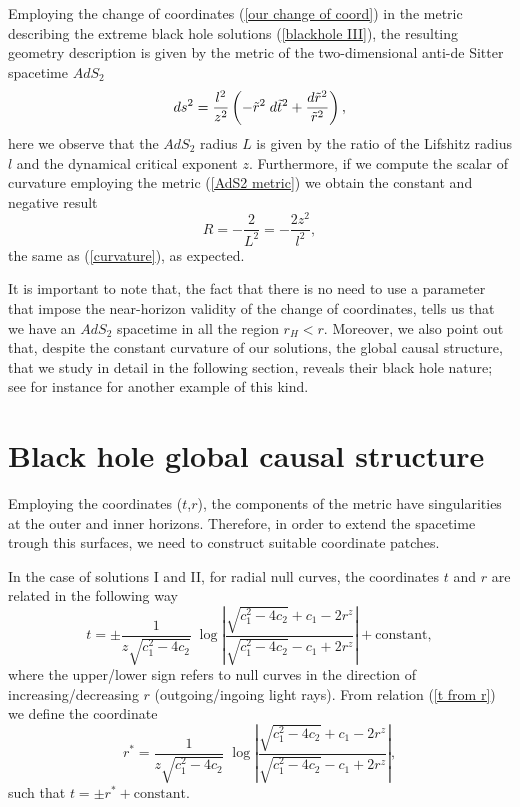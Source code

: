 \documentclass[sn-mathphys,Numbered]{sn-jnl}%
\theoremstyle{thmstyleone}%
\theoremstyle{thmstyletwo}%
\theoremstyle{thmstylethree}%
\begin{document}
Employing the change of coordinates (\ref{our change of coord}) in the metric describing the extreme black hole solutions (\ref{blackhole III}), the resulting geometry description is given by the metric of the two-dimensional anti-de Sitter spacetime $AdS_2$
%
\begin{equation} \label{AdS2 metric}
    ds^2=\frac{l^2}{z^2} \left(-\Tilde{r}^2\;d\Tilde{t}^2+\frac{d\Tilde{r}^2}{\Tilde{r}^2}\right),
\end{equation}
here we observe that the $AdS_2$ radius $L$ is given by the ratio of the Lifshitz radius $l$ and the dynamical critical exponent $z$. Furthermore, if we compute the scalar of curvature employing the metric (\ref{AdS2 metric}) we obtain the constant and negative result
%
\begin{equation}
    R= -\frac{2}{L^2}= - \frac{2 z^2}{l^2},
\end{equation}
the same as (\ref{curvature}), as expected.

It is important to note that, the fact that there is no need to use a parameter that impose the near-horizon validity of the change of coordinates, tells us that we have an $AdS_2$ spacetime in all the region $r_H<r$. Moreover, we also point out that, despite the constant curvature of our solutions, the global causal structure, that we study in detail in the following section, reveals their black hole nature; see for instance \cite{Lemos} for another example of this kind. 

\section{Black hole global causal structure} \label{sec3}

Employing the coordinates ($t$,$r$), the components of the metric have singularities at the outer and inner horizons. Therefore, in order to extend the spacetime trough this surfaces, we need to construct suitable coordinate patches.

In the case of solutions I and II, for radial null curves, the coordinates $t$ and $r$ are related in the following way 
%
\begin{equation} \label{t from r}
    t=\pm  \frac{1}{z \sqrt{c_1^{2}-4 c_{2}}}\;\log \left|\frac{\sqrt{c_{1}^{2}-4 c_{2}}+c_{1}-2 r^{z}}{\sqrt{c_{1}^{2}-4 c_{2}}-c_{1}+2 r^{z}}\right|+\text{constant},
\end{equation}
%
where the upper/lower sign refers to null curves in the direction of increasing/decreasing $r$ (outgoing/ingoing light rays). 
From relation (\ref{t from r}) we define the coordinate 
%
\begin{equation} \label{r star}
    r^*= \frac{1}{z \sqrt{c_1^{2}-4 c_{2}}}\;\log \left|\frac{\sqrt{c_{1}^{2}-4 c_{2}}+c_{1}-2 r^{z}}{\sqrt{c_{1}^{2}-4 c_{2}}-c_{1}+2 r^{z}}\right|,    
\end{equation}
%
such that $ t=\pm r^* + \text{constant}$.
\end{document}
